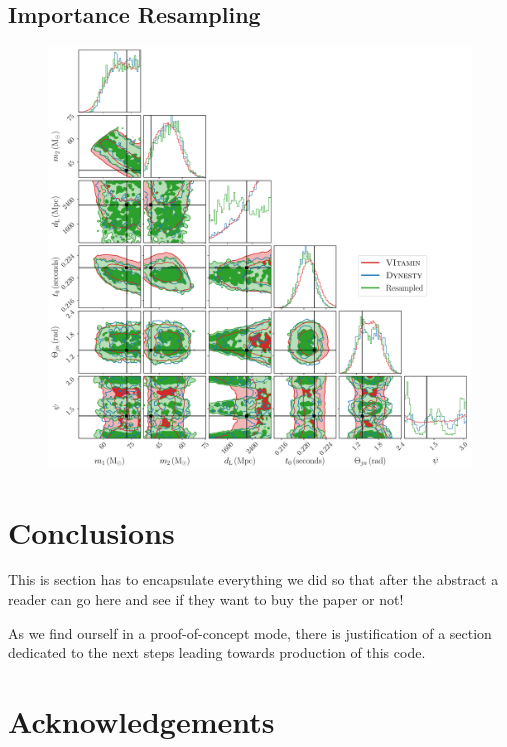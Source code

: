 \documentclass[aps,superscriptaddress,twocolumn,nopreprintnumbers,floatfix,groupedaddress]{revtex4-1}
\newcommand{\doublefigwidth}{17.2cm}
\begin{document}
\subsection{Importance Resampling}


\begin{figure}[h]
	\centering
	\includegraphics[width=\doublefigwidth]{figs/resample_corner.pdf}
	\caption{}
	\label{fig:final_corner}
\end{figure}



\section{Conclusions}\label{conc}

This is section has to encapsulate everything we did so that after the abstract a reader can go here and see if they want to buy the paper or not!

As we find ourself in a proof-of-concept mode, there is justification of a section dedicated to the next steps leading towards production of this code.


\section*{Acknowledgements}
\end{document}
